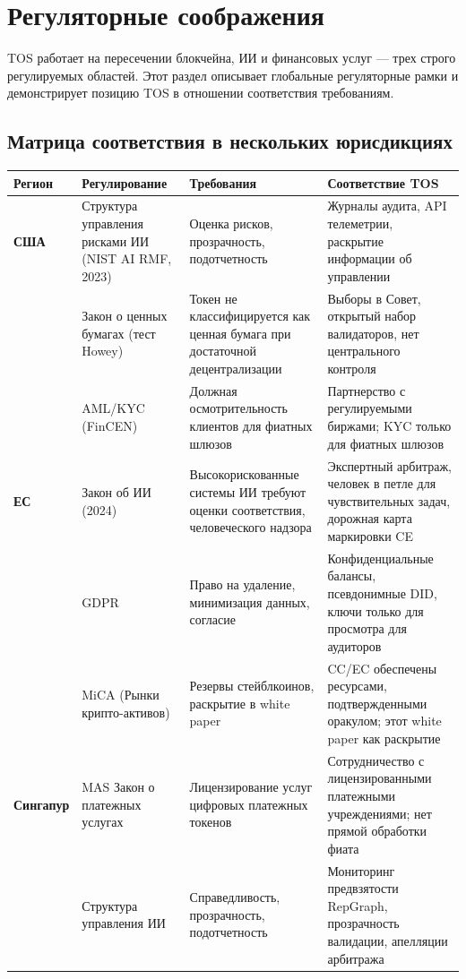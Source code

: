 \documentclass[11pt]{article}
\begin{document}
\section{Регуляторные соображения}
\label{sec:regulatory}

TOS работает на пересечении блокчейна, ИИ и финансовых услуг --- трех строго регулируемых областей. Этот раздел описывает глобальные регуляторные рамки и демонстрирует позицию TOS в отношении соответствия требованиям.

\subsection{Матрица соответствия в нескольких юрисдикциях}

\begin{longtable}{@{}p{}p{}p{}p{}@{}}
\toprule
\textbf{Регион} & \textbf{Регулирование} & \textbf{Требования} & \textbf{Соответствие TOS} \\\midrule
\textbf{США} & Структура управления рисками ИИ (NIST AI RMF, 2023) & Оценка рисков, прозрачность, подотчетность & Журналы аудита, API телеметрии, раскрытие информации об управлении \\
 & Закон о ценных бумагах (тест Howey) & Токен не классифицируется как ценная бумага при достаточной децентрализации & Выборы в Совет, открытый набор валидаторов, нет центрального контроля \\
 & AML/KYC (FinCEN) & Должная осмотрительность клиентов для фиатных шлюзов & Партнерство с регулируемыми биржами; KYC только для фиатных шлюзов \\
\textbf{ЕС} & Закон об ИИ (2024) & Высокорискованные системы ИИ требуют оценки соответствия, человеческого надзора & Экспертный арбитраж, человек в петле для чувствительных задач, дорожная карта маркировки CE \\
 & GDPR & Право на удаление, минимизация данных, согласие & Конфиденциальные балансы, псевдонимные DID, ключи только для просмотра для аудиторов \\
 & MiCA (Рынки крипто-активов) & Резервы стейблкоинов, раскрытие в white paper & CC/EC обеспечены ресурсами, подтвержденными оракулом; этот white paper как раскрытие \\
\textbf{Сингапур} & MAS Закон о платежных услугах & Лицензирование услуг цифровых платежных токенов & Сотрудничество с лицензированными платежными учреждениями; нет прямой обработки фиата \\
 & Структура управления ИИ & Справедливость, прозрачность, подотчетность & Мониторинг предвзятости RepGraph, прозрачность валидации, апелляции арбитража \\

\end{longtable}
\end{document}
